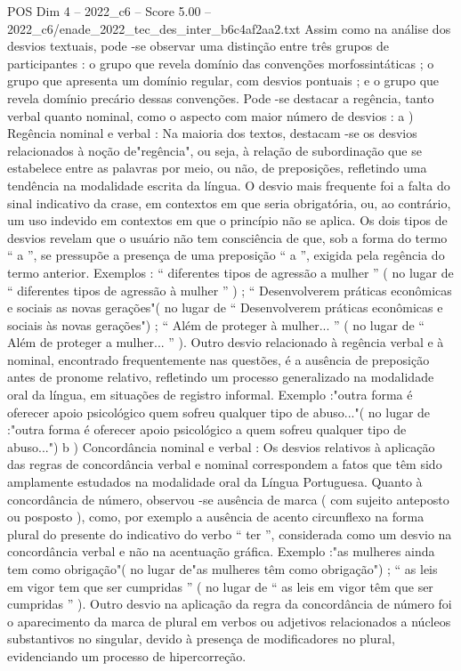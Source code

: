 \begin{textsample}{POS Dim 4 – 2022\_c6 – Score 5.00 – 2022\_c6/enade\_2022\_tec\_des\_inter\_b6c4af2aa2.txt}
Assim como na análise dos desvios textuais, pode -se observar uma distinção entre três grupos de participantes : o grupo que revela domínio das convenções morfossintáticas ; o grupo que apresenta um domínio regular, com desvios pontuais ; e o grupo que revela domínio precário dessas convenções.
Pode -se destacar a regência, tanto verbal quanto nominal, como o aspecto com maior número de desvios : a ) Regência nominal e verbal : Na maioria dos textos, destacam -se os desvios relacionados à noção de"regência", ou seja, à relação de subordinação que se estabelece entre as palavras por meio, ou não, de preposições, refletindo uma tendência na modalidade escrita da língua.
O desvio mais frequente foi a falta do sinal indicativo da crase, em contextos em que seria obrigatória, ou, ao contrário, um uso indevido em contextos em que o princípio não se aplica.
Os dois tipos de desvios revelam que o usuário não tem consciência de que, sob a forma do termo “ a ”, se pressupõe a presença de uma preposição “ a ”, exigida pela regência do termo anterior.
Exemplos : “ diferentes tipos de agressão a mulher ” ( no lugar de “ diferentes tipos de agressão à mulher ” ) ; “ Desenvolverem práticas econômicas e sociais as novas gerações"( no lugar de “ Desenvolverem práticas econômicas e sociais às novas gerações") ; “ Além de proteger à mulher... ” ( no lugar de “ Além de proteger a mulher... ” ).
Outro desvio relacionado à regência verbal e à nominal, encontrado frequentemente nas questões, é a ausência de preposição antes de pronome relativo, refletindo um processo generalizado na modalidade oral da língua, em situações de registro informal.
Exemplo :"outra forma é oferecer apoio psicológico quem sofreu qualquer tipo de abuso..."( no lugar de :"outra forma é oferecer apoio psicológico a quem sofreu qualquer tipo de abuso...") b ) Concordância nominal e verbal : Os desvios relativos à aplicação das regras de concordância verbal e nominal correspondem a fatos que têm sido amplamente estudados na modalidade oral da Língua Portuguesa.
Quanto à concordância de número, observou -se ausência de marca ( com sujeito anteposto ou posposto ), como, por exemplo a ausência de acento circunflexo na forma plural do presente do indicativo do verbo “ ter ”, considerada como um desvio na concordância verbal e não na acentuação gráfica.
Exemplo :"as mulheres ainda tem como obrigação"( no lugar de"as mulheres têm como obrigação") ; “ as leis em vigor tem que ser cumpridas ” ( no lugar de “ as leis em vigor têm que ser cumpridas ” ).
Outro desvio na aplicação da regra da concordância de número foi o aparecimento da marca de plural em verbos ou adjetivos relacionados a núcleos substantivos no singular, devido à presença de modificadores no plural, evidenciando um processo de hipercorreção.

\end{textsample}
